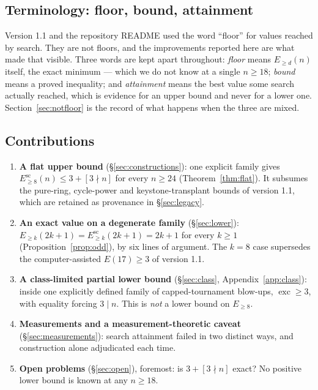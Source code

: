 \documentclass[11pt]{amsart}
\theoremstyle{remark}
\newcommand{\exc}{\operatorname{exc}}
\newcommand{\Esc}{E^{\mathrm{sc}}}
\begin{document}
\subsection*{Terminology: floor, bound, attainment}
Version 1.1 and the repository README used the word ``floor'' for values
reached by search. They are not floors, and the improvements reported here are
what made that visible. Three words are kept apart throughout:
\emph{floor} means $E_{\ge d}(n)$ itself, the exact minimum --- which we do not
know at a single $n \ge 18$; \emph{bound} means a proved inequality; and
\emph{attainment} means the best value some search actually reached, which is
evidence for an upper bound and never for a lower one. Section~\ref{sec:notfloor}
is the record of what happens when the three are mixed.

\subsection*{Contributions}
\begin{enumerate}
\item \textbf{A flat upper bound} (\S\ref{sec:constructions}): one explicit
  family gives $\Esc_{\ge 8}(n) \le 3 + [3 \nmid n]$ for every
  $n \ge 24$ (Theorem~\ref{thm:flat}). It subsumes the pure-ring,
  cycle-power and keystone-transplant bounds of version 1.1, which are
  retained as provenance in \S\ref{sec:legacy}.
\item \textbf{An exact value on a degenerate family} (\S\ref{sec:lower}):
  $E_{\ge k}(2k+1) = \Esc_{\ge k}(2k+1) = 2k+1$ for every
  $k \ge 1$ (Proposition~\ref{prop:odd}), by six lines of argument. The
  $k = 8$ case supersedes the computer-assisted $E(17) \ge 3$ of version 1.1.
\item \textbf{A class-limited partial lower bound} (\S\ref{sec:class},
  Appendix~\ref{app:class}): inside one explicitly defined family of
  capped-tournament blow-ups, $\exc \ge 3$, with equality forcing
  $3 \mid n$. This is \emph{not} a lower bound on $E_{\ge 8}$.
\item \textbf{Measurements and a measurement-theoretic caveat}
  (\S\ref{sec:measurements}): search attainment failed in two distinct ways,
  and construction alone adjudicated each time.
\item \textbf{Open problems} (\S\ref{sec:open}), foremost: is
  $3 + [3 \nmid n]$ exact? No positive lower bound is known at any
  $n \ge 18$.
\end{enumerate}
\end{document}
